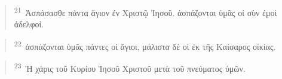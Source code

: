 \documentclass{article}
\newcommand{\currentverse}{1} %
\newcommand{\setcurrentverse}[1]{\renewcommand{\currentverse}{#1}}
\begin{document}
\begin{verse}

\setcurrentverse{21}

\setcounter{footnote}{0}

\textsuperscript{21}~Ἀσπάσασθε πάντα ἅγιον ἐν Χριστῷ Ἰησοῦ. ἀσπάζονται ὑμᾶς οἱ σὺν ἐμοὶ ἀδελφοί.

\end{verse}

\begin{verse}

\setcurrentverse{22}

\setcounter{footnote}{0}

\textsuperscript{22}~ἀσπάζονται ὑμᾶς πάντες οἱ ἅγιοι, μάλιστα δὲ οἱ ἐκ τῆς Καίσαρος οἰκίας.

\end{verse}

\begin{verse}

\setcurrentverse{23}

\setcounter{footnote}{0}

\textsuperscript{23}~Ἡ χάρις τοῦ Κυρίου Ἰησοῦ Χριστοῦ μετὰ τοῦ πνεύματος ὑμῶν.

\end{verse}
\end{document}
